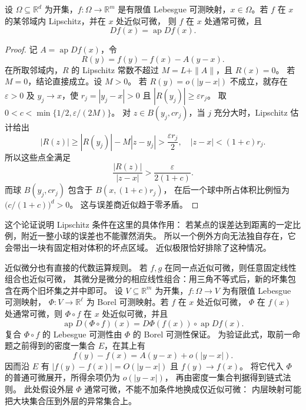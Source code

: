 \begin{proposition}\label{b1:prop:lipschitz-approximate-ordinary}
设 \(\Omega\subseteq\mathbb R^d\) 为开集，\(f:\Omega\to\mathbb R^m\) 是有限值 Lebesgue 可测映射，\(x\in\Omega\)。若 \(f\) 在 \(x\) 的某邻域内 Lipschitz，并在 \(x\) 处近似可微，
则 \(f\) 在 \(x\) 处通常可微，且
\[
 Df(x)=\operatorname{ap}Df(x).
\]
\end{proposition}
\begin{proof}
记 \(A=\operatorname{ap}Df(x)\)，令
\[
 R(y)=f(y)-f(x)-A(y-x).
\]
在所取邻域内，\(R\) 的 Lipschitz 常数不超过 \(M=L+\|A\|\)，且 \(R(x)=0\)。
若 \(M=0\)，结论直接成立。设 \(M>0\)。
若 \(R(y)=o(|y-x|)\) 不成立，就存在 \(\varepsilon>0\) 及
\(y_j\to x\)，使 \(r_j=|y_j-x|>0\) 且 \(|R(y_j)|\geq\varepsilon r_j\)。
取 \(0<c<\min\{1/2,\varepsilon/(2M)\}\)。
对 \(z\in B(y_j,cr_j)\)，当 \(j\) 充分大时，Lipschitz 估计给出
\[
 |R(z)|\geq |R(y_j)|-M|z-y_j|>\frac{\varepsilon r_j}{2},
 \quad |z-x|<(1+c)r_j.
\]
所以这些点全满足
\[
 \frac{|R(z)|}{|z-x|}>\frac{\varepsilon}{2(1+c)}.
\]
而球 \(B(y_j,cr_j)\) 包含于 \(B(x,(1+c)r_j)\)，
在后一个球中所占体积比例恒为 \(\bigl(c/(1+c)\bigr)^d>0\)。
这与误差商近似趋于零矛盾。
\end{proof}

这个论证说明 Lipschitz 条件在这里的具体作用：
若某点的误差达到距离的一定比例，附近一整小球的误差也不能骤然消失。
所以一个例外方向无法独自存在，它会带出一块有固定相对体积的坏点区域。
近似极限恰好排除了这种情况。

\ProseParagraphBreak

近似微分也有直接的代数运算规则。
若 \(f,g\) 在同一点近似可微，则任意固定线性组合也近似可微，
其微分是微分的相应线性组合：用三角不等式后，新的坏集包含在两个旧坏集之并中即可。
设 \(V\subseteq\mathbb R^m\) 为开集，\(f:\Omega\to V\) 为有限值 Lebesgue 可测映射，
\(\Phi:V\to\mathbb R^\ell\) 为 Borel 可测映射。若 \(f\) 在 \(x\) 处近似可微，
\(\Phi\) 在 \(f(x)\) 处通常可微，则 \(\Phi\circ f\) 在 \(x\) 处近似可微，并且
\begin{equation}\label{b1:eq:approximate-chain-rule}
 \operatorname{ap}D(\Phi\circ f)(x)
 =D\Phi(f(x))\circ\operatorname{ap}Df(x).
\end{equation}
复合 \(\Phi\circ f\) 的 Lebesgue 可测性由 \(\Phi\) 的 Borel 可测性保证。
为验证此式，取前一命题之前得到的密度一集合 \(E\)，在其上有
\[
 f(y)-f(x)=A(y-x)+o(|y-x|).
\]
因而沿 \(E\) 有 \(|f(y)-f(x)|=O(|y-x|)\) 且 \(f(y)\to f(x)\)。
将它代入 \(\Phi\) 的普通可微展开，所得余项仍为 \(o(|y-x|)\)，
再由密度一集合判据得到链式法则。
此处假设外层 \(\Phi\) 通常可微，不能不加条件地换成仅近似可微：
内层映射可能把大块集合压到外层的异常集合上。

